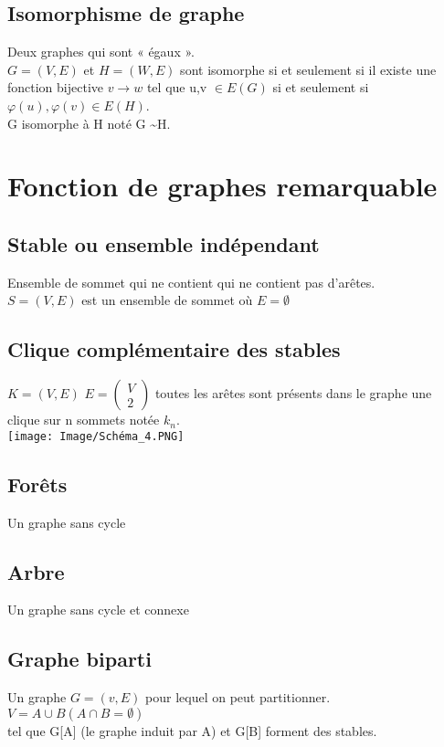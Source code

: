 \documentclass{article}
\begin{document}
{\subsection{Isomorphisme de graphe}
Deux graphes qui sont « égaux ». \\
$G=(V,E)$ et $H=(W,E)$ sont isomorphe si et seulement si il existe une fonction bijective $v \rightarrow w$ tel que u,v $\in E(G)$ si et seulement si $\varphi (u), \varphi (v) \in E(H)$.
\\
G isomorphe à H noté G \sim H.

\section{Fonction de graphes remarquable}
\subsection{Stable ou ensemble indépendant}
Ensemble de sommet qui ne contient qui ne contient pas d’arêtes. \\
$S=(V,E)$ est un ensemble de sommet où $E= \emptyset$

\subsection{Clique complémentaire des stables}
$K=(V,E)$ $E=\begin{pmatrix} V \\ 2 \end{pmatrix}$ toutes les arêtes sont présents dans le graphe une clique sur n sommets notée $k_n$. \\
\texttt{[image: Image/Schéma\_4.PNG]} \\

\subsection{Forêts}
Un graphe sans cycle

\subsection{Arbre}
Un graphe sans cycle et connexe

\subsection{Graphe biparti}
Un graphe $G=(v,E)$ pour lequel on peut partitionner. \\
$V=A \cup B (A \cap B=\emptyset)$ \\
tel que G[A] (le graphe induit par A) et G[B] forment des stables.
  
}
\end{document}
